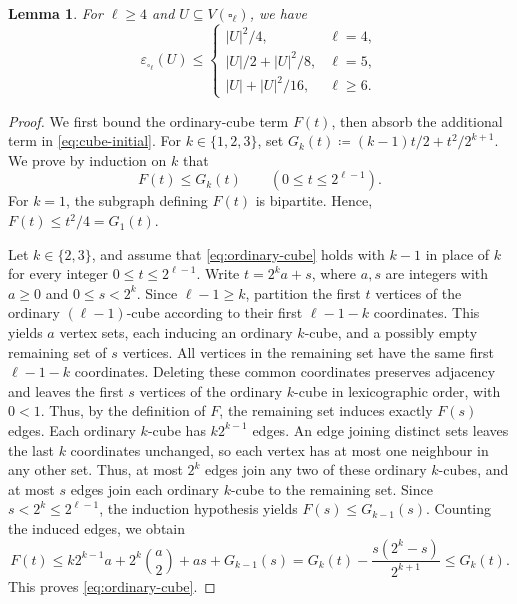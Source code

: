 \documentclass[10pt,a4paper]{article}
\numberwithin{equation}{section}
\newtheorem{lemma}[lemma]{Lemma}
\begin{document}
\begin{lemma}\label{lem:cube}
For \(\ell\ge4\) and \(U\subseteq V(\square_\ell)\), we have
\[
 \varepsilon_{\square_\ell}(U)\le
 \begin{cases}
 |U|^2/4,&\ell=4,\\
 |U|/2+|U|^2/8,&\ell=5,\\
 |U|+|U|^2/16,&\ell\ge6.
 \end{cases}
\]
\end{lemma}
\begin{proof}
We first bound the ordinary-cube term \(F(t)\), then absorb
the additional term in \eqref{eq:cube-initial}.
For \(k\in\{1,2,3\}\), set
\(G_k(t)\coloneqq(k-1)t/2+t^2/2^{k+1}\). We prove by induction on \(k\) that
\begin{equation}\label{eq:ordinary-cube}
 F(t)\le G_k(t)\qquad(0\le t\le2^{\ell-1}).
\end{equation}
For \(k=1\), the subgraph defining \(F(t)\) is bipartite.
Hence, \(F(t)\le t^2/4=G_1(t)\).

Let \(k\in\{2,3\}\), and assume that \eqref{eq:ordinary-cube} holds
with \(k-1\) in place of \(k\) for every integer \(0\le t\le2^{\ell-1}\).
Write \(t=2^k a+s\), where \(a,s\) are integers with \(a\ge0\) and \(0\le s<2^k\).
Since \(\ell-1\ge k\), partition the first \(t\) vertices of the ordinary
\((\ell-1)\)-cube according to their first \(\ell-1-k\) coordinates.
This yields \(a\) vertex sets, each inducing an ordinary \(k\)-cube,
and a possibly empty remaining set of \(s\) vertices.
All vertices in the remaining set have the same first \(\ell-1-k\) coordinates.
Deleting these common coordinates preserves adjacency and leaves the first
\(s\) vertices of the ordinary \(k\)-cube in lexicographic order, with \(0<1\).
Thus, by the definition of \(F\), the remaining set induces exactly \(F(s)\) edges.
Each ordinary \(k\)-cube has \(k2^{k-1}\) edges.
An edge joining distinct sets leaves the last \(k\) coordinates unchanged,
so each vertex has at most one neighbour in any other set.
Thus, at most \(2^k\) edges join any two of these ordinary \(k\)-cubes,
and at most \(s\) edges join each ordinary \(k\)-cube to the remaining set.
Since \(s<2^k\le2^{\ell-1}\), the induction hypothesis yields
\(F(s)\le G_{k-1}(s)\).
Counting the induced edges, we obtain
\[
 F(t)\le k2^{k-1}a+2^k\binom a2+as+G_{k-1}(s)=G_k(t)-\frac{s(2^k-s)}{2^{k+1}}\le G_k(t).
\]
This proves \eqref{eq:ordinary-cube}.


\end{proof}
\end{document}
